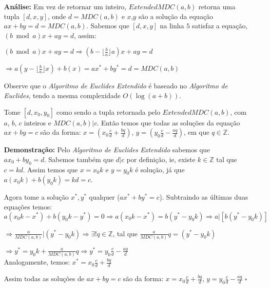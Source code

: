 \textbf{Análise:}
Em vez de retornar um inteiro, $ExtendedMDC(a,b)$ retorna uma tupla $[d,x,y]$, onde $d=MDC(a,b)$ e $x$,$y$ são a solução da equação $ax+by=d=MDC(a,b)$.
Sabemos que $[d,x,y]$ na linha $5$ satisfaz a equação, $(b\bmod a)x + ay = d$, assim:

$(b\bmod a)x + ay = d \Rightarrow (b - \lfloor \frac{b}{a} \rfloor a)x + ay = d$

$\Rightarrow a(y-\lfloor \frac{b}{a} \rfloor x) + b(x) = ax^* + by^* = d = MDC(a,b)$

Observe que o \textit{Algoritmo de Euclides Extendido} é baseado no \textit{Algoritmo de Euclides}, tendo a mesma complexidade $O(\log(a+b))$.
\\


\begin{corollary}\label{mdc_extended_solutions}
Tome $[d,x_0,y_0]$ como sendo a tupla retornada pelo $ExtendedMDC(a,b)$, com $a$, $b$, $c$ inteiros e $MDC(a,b)|c$.
Então temos que todas as soluções da equação $ax+by=c$ são da forma: $x=(x_0\frac{c}{d} + \frac{bq}{d})$, $y=(y_0\frac{c}{d} - \frac{aq}{d})$, em que $q\in\mathbb{Z}$.
\end{corollary}
\textbf{Demonstração:}
Pelo \textit{Algoritmo de Euclides Extendido} sabemos que $ax_0 + by_0=d$. Sabemos também que $d|c$ por definição, ie, existe $k\in\mathbb{Z}$ tal que $c=kd$.
Assim temos que $x=x_0k$ e $y=y_0k$ é solução, já que $a(x_0k)+b(y_0k) = kd = c$. 

Agora tome a solução $x^*,y^*$ qualquer ($ax^*+by^*=c$). Subtraindo as últimas duas equações temos:
\\

$a(x_0k-x^*) + b(y_0k-y^*) = 0 \Rightarrow a(x_0k-x^*) = b(y^* - y_0k) \Rightarrow a|[b(y^* - y_0k)]$

$\Rightarrow \frac{a}{MDC(a,b)}|(y^* - y_0k) \Rightarrow \exists! q\in\mathbb{Z}$, tal que $\frac{a}{MDC(a,b)}q = (y^* - y_0k)$

$\Rightarrow y^* = y_0k + \frac{a}{MDC(a,b)}q \Rightarrow y^* = y_0\frac{c}{d} - \frac{aq}{d}$
\\

Analogamente, temos: $x^* = x_0\frac{c}{d} + \frac{bq}{d}$

Assim todas as soluções de $ax+by=c$ são da forma:
$x = x_0\frac{c}{d} + \frac{bq}{d}$, $y = y_0\frac{c}{d} - \frac{aq}{d}$ $\square$
\\



